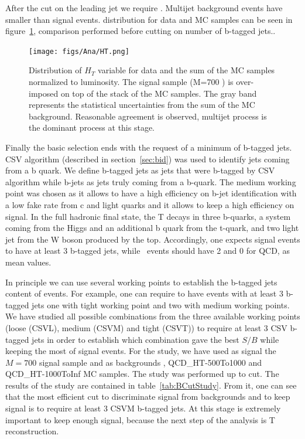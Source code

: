 After the cut on the leading jet \pt we require . Multijet background events have smaller \HT than signal events. \HT distribution for data and MC samples can be seen in figure~\ref{fig:HT}, comparison performed before cutting on number of b-tagged jets..

\begin{figure}[!Hhtbp]
  \begin{center}
    \texttt{[image: figs/Ana/HT.png]}
    \caption{Distribution of $H_{T}$ variable for data and the sum of the MC samples normalized to luminosity. The signal sample (M=700 \GeVcc) is over-imposed on top of the stack of the MC samples. The gray band represents the statistical uncertainties from the sum of the MC background. Reasonable agreement is observed, multijet process is the dominant process at this stage.}
    \label{fig:HT}
  \end{center}
\end{figure}

Finally the basic selection ends with the request of a minimum of b-tagged jets. CSV algorithm (described in section~\ref{sec:bid}) was used to identify jets coming from a b quark. We define b-tagged jets as jets that were b-tagged by CSV algorithm while b-jets as jets truly coming from a b-quark. The medium working point was chosen as it allows to have a high efficiency on b-jet identification with a low fake rate from c and light quarks and it allows to keep a high efficiency on signal. In the full hadronic final state, the T decays in three b-quarks, a \bbbar system coming from the Higgs and an additional b quark from the t-quark, and two light jet from the W boson produced by the top. Accordingly, one expects signal events to have at least 3 b-tagged jets, while \ttbar~events should have 2 and 0 for QCD, as mean values.

In principle we can use several working points to establish the b-tagged jets content of events. For example, one can require to have events with at least 3 b-tagged jets one with tight working point and two with medium working points. We have studied all possible combinations from the three available working points (loose (CSVL), medium (CSVM) and tight (CSVT)) to require at least 3 CSV b-tagged jets in order to establish which combination gave the best $S/B$ while keeping the most of signal events. For the study, we have used as signal the $M=700$ \GeVcc signal sample and as backgrounds \ttbar, QCD\_HT-500To1000 and QCD\_HT-1000ToInf MC samples. The study was performed up to \HT cut. The results of the study are contained in table~\ref{tab:BCutStudy}. From it, one can see that the most efficient cut to discriminate signal from backgrounds and to keep signal is to require at least 3 CSVM b-tagged jets. At this stage is extremely important to keep enough signal, because the next step of the analysis is T reconstruction.

